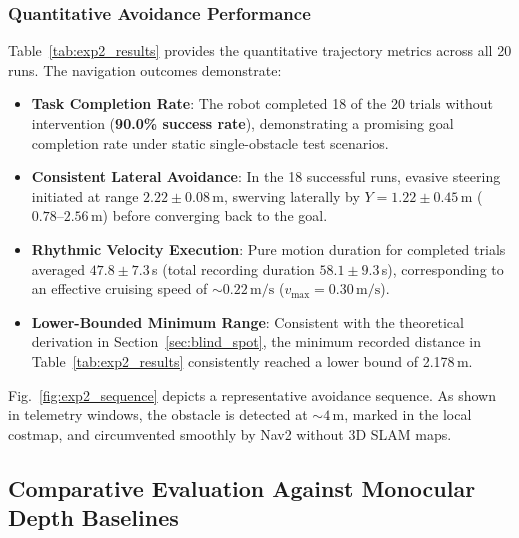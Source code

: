 \documentclass{ieeeaccess}
\begin{document}
\subsubsection{Quantitative Avoidance Performance}
Table~\ref{tab:exp2_results} provides the quantitative trajectory metrics across all 20 runs. The navigation outcomes demonstrate:
\begin{itemize}
  \item \textbf{Task Completion Rate}: The robot completed 18 of the 20 trials without intervention (\textbf{90.0\% success rate}), demonstrating a promising goal completion rate under static single-obstacle test scenarios.
  \item \textbf{Consistent Lateral Avoidance}: In the 18 successful runs, evasive steering initiated at range $2.22 \pm 0.08$\,m, swerving laterally by $Y = 1.22 \pm 0.45$\,m ($0.78\text{--}2.56$\,m) before converging back to the goal.
  \item \textbf{Rhythmic Velocity Execution}: Pure motion duration for completed trials averaged $47.8 \pm 7.3$\,s (total recording duration $58.1 \pm 9.3$\,s), corresponding to an effective cruising speed of $\sim0.22\,\text{m/s}$ ($v_{\max} = 0.30\,\text{m/s}$).
  \item \textbf{Lower-Bounded Minimum Range}: Consistent with the theoretical derivation in Section~\ref{sec:blind_spot}, the minimum recorded distance in Table~\ref{tab:exp2_results} consistently reached a lower bound of 2.178\,m.
\end{itemize}

Fig.~\ref{fig:exp2_sequence} depicts a representative avoidance sequence. As shown in telemetry windows, the obstacle is detected at $\sim 4$\,m, marked in the local costmap, and circumvented smoothly by Nav2 without 3D SLAM maps.

\subsection{Comparative Evaluation Against Monocular Depth Baselines}
\label{subsec:baseline_benchmark}
\end{document}
